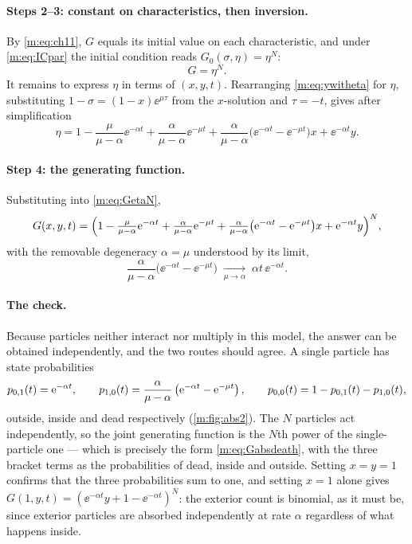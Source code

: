 \paragraph{Steps 2--3: constant on characteristics, then inversion.}
By \cref{m:eq:ch11}, $G$ equals its initial value on each characteristic, and
under \cref{m:eq:ICpar} the initial condition reads $G_0(\sigma,\eta)=\eta^N$:
\begin{equation}
\label{m:eq:GetaN}
G = \eta^N .
\end{equation}
It remains to express $\eta$ in terms of $(x,y,t)$. Rearranging
\cref{m:eq:ywitheta} for $\eta$, substituting $1-\sigma=(1-x)\ee^{\mu\tau}$
from the $x$-solution and $\tau=-t$, gives after simplification
\begin{equation*}
\eta = 1-\frac{\mu}{\mu-\alpha}\ee^{-\alpha t}
+ \frac{\alpha}{\mu-\alpha}\ee^{-\mu t}
+ \frac{\alpha}{\mu-\alpha}\bigl(\ee^{-\alpha t}-\ee^{-\mu t}\bigr)x
+ \ee^{-\alpha t}y .
\end{equation*}

\paragraph{Step 4: the generating function.}
Substituting into \cref{m:eq:GetaN},
\begin{equation}
\label{m:eq:Gabsdeath}
G(x,y,t) = \Bigl(
1-\tfrac{\mu}{\mu-\alpha}\mathrm{e}^{-\alpha t} + \tfrac{\alpha}{\mu-\alpha}\mathrm{e}^{-\mu t}
+ \tfrac{\alpha}{\mu-\alpha}\bigl(\mathrm{e}^{-\alpha t}-\mathrm{e}^{-\mu t}\bigr)x
+ \mathrm{e}^{-\alpha t}y\Bigr)^N ,
\end{equation}
with the removable degeneracy $\alpha=\mu$ understood by its limit,
\begin{equation}
\label{m:eq:equalrates}
\frac{\alpha}{\mu-\alpha}\bigl(\ee^{-\alpha t}-\ee^{-\mu t}\bigr)
\;\xrightarrow[\mu\to\alpha]{}\;
\alpha t\,\ee^{-\alpha t} .
\end{equation}

\paragraph{The check.}
Because particles neither interact nor multiply in this model, the answer can
be obtained independently, and the two routes should agree. A single particle
has state probabilities
\begin{equation}
\label{m:eq:absdeathstates}
p_{0,1}(t) = \mathrm{e}^{-\alpha t},
\qquad
p_{1,0}(t) = \frac{\alpha}{\mu-\alpha}\left(\mathrm{e}^{-\alpha t}-\mathrm{e}^{-\mu t}\right),
\qquad
p_{0,0}(t) = 1-p_{0,1}(t)-p_{1,0}(t),
\end{equation}
outside, inside and dead respectively (\cref{m:fig:abs2}). The $N$ particles
act independently,
so the joint generating function is the $N$th power of the single-particle one
--- which is precisely the form \cref{m:eq:Gabsdeath}, with the three bracket
terms as the probabilities of dead, inside and outside. Setting $x=y=1$
confirms that the three probabilities sum to one, and setting $x=1$ alone gives
$G(1,y,t) = (\ee^{-\alpha t}y + 1-\ee^{-\alpha t})^N$: the exterior count is
binomial, as it must be, since exterior particles are absorbed independently at
rate $\alpha$ regardless of what happens inside.

